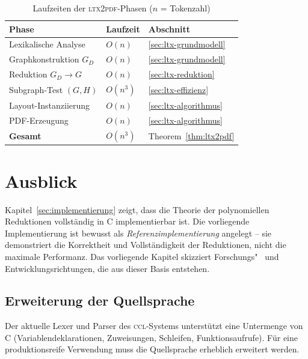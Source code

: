 ﻿\documentclass[a4paper,12pt]{article}
\theoremstyle{definition}
\begin{document}
\begin{table}[h!]
	\centering
	\renewcommand{\arraystretch}{1.4}
	\begin{tabular}{|l|l|l|}
		\hline
		\textbf{Phase} & \textbf{Laufzeit} & \textbf{Abschnitt} \\
		\hline
		Lexikalische Analyse         & $O(n)$   & \ref{sec:ltx-grundmodell} \\
		Graphkonstruktion $G_D$      & $O(n)$   & \ref{sec:ltx-grundmodell} \\
		Reduktion $G_D \to G$        & $O(n)$   & \ref{sec:ltx-reduktion}   \\
		Subgraph-Test $(G, H)$       & $O(n^3)$ & \ref{sec:ltx-effizienz}   \\
		Layout-Instanziierung        & $O(n)$   & \ref{sec:ltx-algorithmus} \\
		PDF-Erzeugung                & $O(n)$   & \ref{sec:ltx-algorithmus} \\
		\hline
		\textbf{Gesamt}              & $O(n^3)$ & Theorem~\ref{thm:ltx2pdf} \\
		\hline
	\end{tabular}
	\caption{Laufzeiten der \textsc{ltx2pdf}-Phasen ($n$ = Tokenzahl)}
	\label{tab:ltx-laufzeit}
\end{table}


\section{Ausblick}
\label{sec:ausblick-impl}

Kapitel~\ref{sec:implementierung} zeigt, dass die Theorie der polynomiellen
Reduktionen vollständig in C implementierbar ist. Die vorliegende
Implementierung ist bewusst als \emph{Referenzimplementierung} angelegt --
sie demonstriert die Korrektheit und Vollständigkeit der Reduktionen,
nicht die maximale Performanz. Das vorliegende Kapitel skizziert
Forschungs"~ und Entwicklungsrichtungen, die aus dieser Basis entstehen.

\subsection{Erweiterung der Quellsprache}
\label{sec:ausblick-sprache}

Der aktuelle Lexer und Parser des \textsc{ccl}-Systems unterstützt eine
Untermenge von C (Variablendeklarationen, Zuweisungen, Schleifen,
Funktionsaufrufe). Für eine produktionsreife Verwendung muss die
Quellsprache erheblich erweitert werden.
\end{document}
